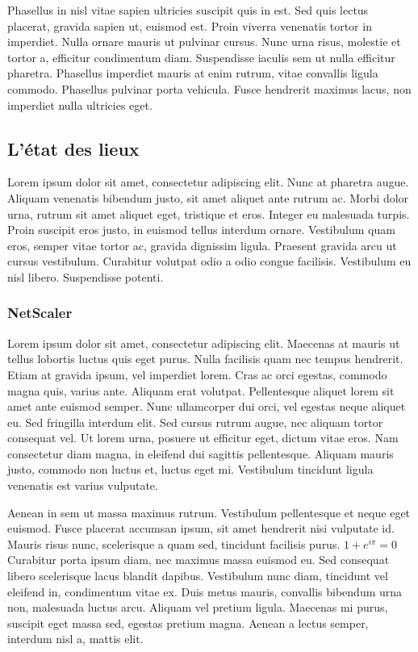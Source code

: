 \documentclass{report}
\begin{document}
Phasellus in nisl vitae sapien ultricies suscipit quis in est. Sed quis lectus placerat, gravida sapien ut, euismod est. Proin viverra venenatis tortor in imperdiet. Nulla ornare mauris ut pulvinar cursus. Nunc urna risus, molestie et tortor a, efficitur condimentum diam. Suspendisse iaculis sem ut nulla efficitur pharetra. Phasellus imperdiet mauris at enim rutrum, vitae convallis ligula commodo. Phasellus pulvinar porta vehicula. Fusce hendrerit maximus lacus, non imperdiet nulla ultricies eget.


\subsection{L'état des lieux}

Lorem ipsum dolor sit amet, consectetur adipiscing elit. Nunc at pharetra augue. Aliquam venenatis bibendum justo, sit amet aliquet ante rutrum ac. Morbi dolor urna, rutrum sit amet aliquet eget, tristique et eros. Integer eu malesuada turpis. Proin suscipit eros justo, in euismod tellus interdum ornare. Vestibulum quam eros, semper vitae tortor ac, gravida dignissim ligula. Praesent gravida arcu ut cursus vestibulum. Curabitur volutpat odio a odio congue facilisis. Vestibulum eu nisl libero. Suspendisse potenti.

\subsubsection{NetScaler}
Lorem ipsum dolor sit amet, consectetur adipiscing elit. Maecenas at mauris ut tellus lobortis luctus quis eget purus. Nulla facilisis quam nec tempus hendrerit. Etiam at gravida ipsum, vel imperdiet lorem. Cras ac orci egestas, commodo magna quis, varius ante. Aliquam erat volutpat. Pellentesque aliquet lorem sit amet ante euismod semper. Nunc ullamcorper dui orci, vel egestas neque aliquet eu. Sed fringilla interdum elit. Sed cursus rutrum augue, nec aliquam tortor consequat vel. Ut lorem urna, posuere ut efficitur eget, dictum vitae eros. Nam consectetur diam magna, in eleifend dui sagittis pellentesque. Aliquam mauris justo, commodo non luctus et, luctus eget mi. Vestibulum tincidunt ligula venenatis est varius vulputate.

Aenean in sem ut massa maximus rutrum. Vestibulum pellentesque et neque eget euismod. Fusce placerat accumsan ipsum, sit amet hendrerit nisi vulputate id. Mauris risus nunc, scelerisque a quam sed, tincidunt facilisis purus. ${1}+e^{i\pi}={0}$ Curabitur porta ipsum diam, nec maximus massa euismod eu. Sed consequat libero scelerisque lacus blandit dapibus. Vestibulum nunc diam, tincidunt vel eleifend in, condimentum vitae ex. Duis metus mauris, convallis bibendum urna non, malesuada luctus arcu. Aliquam vel pretium ligula. Maecenas mi purus, suscipit eget massa sed, egestas pretium magna. Aenean a lectus semper, interdum nisl a, mattis elit.
\end{document}
